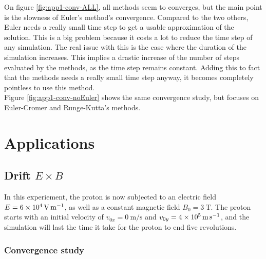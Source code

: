 \documentclass[a4paper,12pt,twoside]{article}
\begin{document}
On figure \ref{fig:app1-conv-ALL}, all methods seem to converges, but the main point is the slowness of Euler's method's convergence.
Compared to the two others, Euler needs a really small time step to get a usable approximation of the solution.
This is a big problem because it costs a lot to reduce the time step of any simulation.
The real issue with this is the case where the duration of the simulation increases. 
This implies a drastic increase of the number of steps evaluated by the methods, as the time step remains constant.
Adding this to fact that the methods needs a really small time step anyway, it becomes completely pointless to use this method.\\

Figure \ref{fig:app1-conv-noEuler} shows the same convergence study, but focuses on Euler-Cromer and Runge-Kutta's methods.


\section{Applications}
\subsection{Drift $E\times B$}
In this experiement, the proton is now subjected to an electric field $E=\SI{6d4}{\volt\per\meter}$, as well as a constant magnetic field $B_0 = \SI{3}{\tesla}$.
The proton starts with an initial velocity of $v_{0x}=\SI{0}{\meter\per\second}$ and $v_{0y}=\SI{4d5}{\meter\per\second}$, and the simulation will last the time it take for the proton to end five revolutions.
\subsubsection{Convergence study}%
\end{document}
